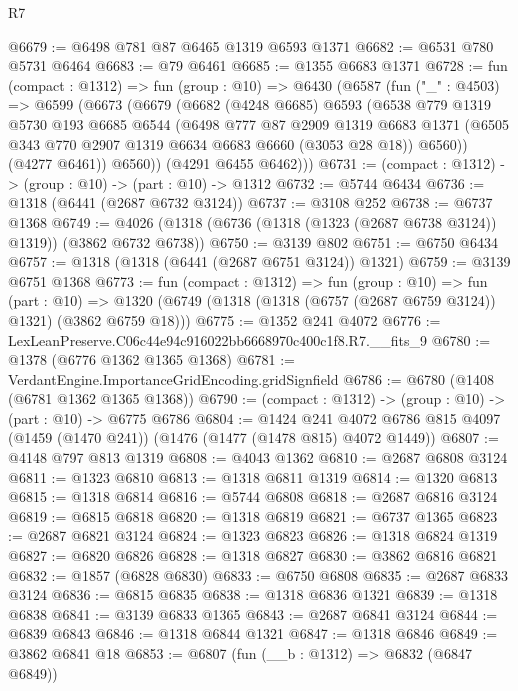 \begin{lexlean}{R7}
\begin{coremodule}
@6679 := @6498 @781 @87 @6465 @1319 @6593 @1371
@6682 := @6531 @780 @5731 @6464
@6683 := @79 @6461
@6685 := @1355 @6683 @1371
@6728 := fun (compact : @1312) =>
  fun (group : @10) =>
  @6430
    (@6587
      (fun ("_" : @4503) =>
      @6599
        (@6673
          (@6679
            (@6682
              (@4248 @6685)
              @6593
              (@6538
                @779
                @1319
                @5730
                @193
                @6685
                @6544
                (@6498
                  @777
                  @87
                  @2909
                  @1319
                  @6683
                  @1371
                  (@6505 @343 @770 @2907 @1319 @6634 @6683 @6660 (@3053 @28 @18))
                  @6560))
              (@4277 @6461))
            @6560))
        (@4291 @6455 @6462)))
@6731 := (compact : @1312) -> (group : @10) -> (part : @10) -> @1312
@6732 := @5744 @6434
@6736 := @1318 (@6441 (@2687 @6732 @3124))
@6737 := @3108 @252
@6738 := @6737 @1368
@6749 := @4026 (@1318 (@6736 (@1318 (@1323 (@2687 @6738 @3124)) @1319)) (@3862 @6732 @6738))
@6750 := @3139 @802
@6751 := @6750 @6434
@6757 := @1318 (@1318 (@6441 (@2687 @6751 @3124)) @1321)
@6759 := @3139 @6751 @1368
@6773 := fun (compact : @1312) =>
  fun (group : @10) =>
  fun (part : @10) =>
  @1320 (@6749 (@1318 (@1318 (@6757 (@2687 @6759 @3124)) @1321) (@3862 @6759 @18)))
@6775 := @1352 @241 @4072
@6776 := LexLeanPreserve.C06c44e94c916022bb6668970c400c1f8.R7.__fits_9
@6780 := @1378 (@6776 @1362 @1365 @1368)
@6781 := VerdantEngine.ImportanceGridEncoding.gridSignfield
@6786 := @6780 (@1408 (@6781 @1362 @1365 @1368))
@6790 := (compact : @1312) -> (group : @10) -> (part : @10) -> @6775 @6786
@6804 := @1424
    @241
    @4072
    @6786
    @815
    @4097
    (@1459 (@1470 @241))
    (@1476 (@1477 (@1478 @815) @4072 @1449))
@6807 := @4148 @797 @813 @1319
@6808 := @4043 @1362
@6810 := @2687 @6808 @3124
@6811 := @1323 @6810
@6813 := @1318 @6811 @1319
@6814 := @1320 @6813
@6815 := @1318 @6814
@6816 := @5744 @6808
@6818 := @2687 @6816 @3124
@6819 := @6815 @6818
@6820 := @1318 @6819
@6821 := @6737 @1365
@6823 := @2687 @6821 @3124
@6824 := @1323 @6823
@6826 := @1318 @6824 @1319
@6827 := @6820 @6826
@6828 := @1318 @6827
@6830 := @3862 @6816 @6821
@6832 := @1857 (@6828 @6830)
@6833 := @6750 @6808
@6835 := @2687 @6833 @3124
@6836 := @6815 @6835
@6838 := @1318 @6836 @1321
@6839 := @1318 @6838
@6841 := @3139 @6833 @1365
@6843 := @2687 @6841 @3124
@6844 := @6839 @6843
@6846 := @1318 @6844 @1321
@6847 := @1318 @6846
@6849 := @3862 @6841 @18
@6853 := @6807 (fun (__b : @1312) => @6832 (@6847 @6849))

\end{coremodule}
\end{lexlean}

